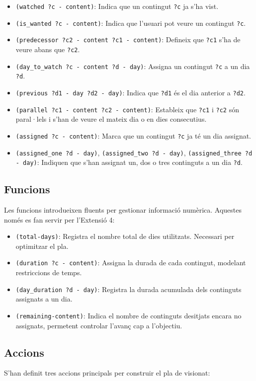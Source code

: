 \documentclass[a4paper]{article}
\begin{document}
	\begin{itemize}
		\item \texttt{(watched ?c - content)}: Indica que un contingut \texttt{?c} ja s'ha vist.
		\item \texttt{(is\_wanted ?c - content)}: Indica que l'usuari pot veure un contingut \texttt{?c}.
		\item \texttt{(predecessor ?c2 - content ?c1 - content)}: Defineix que \texttt{?c1} s'ha de veure abans que \texttt{?c2}.
		\item \texttt{(day\_to\_watch ?c - content ?d - day)}: Assigna un contingut \texttt{?c} a un dia \texttt{?d}.
		\item \texttt{(previous ?d1 - day ?d2 - day)}: Indica que \texttt{?d1} és el dia anterior a \texttt{?d2}.
		\item \texttt{(parallel ?c1 - content ?c2 - content)}: Estableix que \texttt{?c1} i \texttt{?c2} són paral·lels i s'han de veure el mateix dia o en dies consecutius.
		\item \texttt{(assigned ?c - content)}: Marca que un contingut \texttt{?c} ja té un dia assignat.
		\item \texttt{(assigned\_one ?d - day)}, \texttt{(assigned\_two ?d - day)}, \texttt{(assigned\_three ?d - day)}: Indiquen que s'han assignat un, dos o tres continguts a un dia \texttt{?d}.
	\end{itemize}
	
	\subsection{Funcions}
	Les funcions introdueixen fluents per gestionar informació numèrica. Aquestes només es fan servir per l'Extensió 4:
	
	\begin{itemize}
		\item \texttt{(total-days)}: Registra el nombre total de dies utilitzats. Necessari per optimitzar el pla.
		\item \texttt{(duration ?c - content)}: Assigna la durada de cada contingut, modelant restriccions de temps.
		\item \texttt{(day\_duration ?d - day)}: Registra la durada acumulada dels continguts assignats a un dia.
		\item \texttt{(remaining-content)}: Indica el nombre de continguts desitjats encara no assignats, permetent controlar l'avanç cap a l'objectiu.
	\end{itemize}
	
	\subsection{Accions}
	S'han definit tres accions principals per construir el pla de visionat:
	
\end{document}
